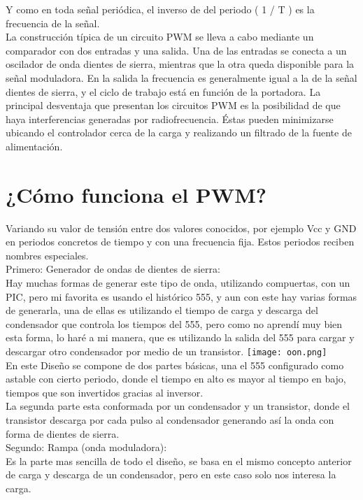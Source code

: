 \documentclass[10pt,a4paper]{article}
\begin{document}
Y como en toda señal periódica, el inverso de del periodo ( 1 / T ) es la frecuencia de la señal.\\
\bigskip 
La construcción típica de un circuito PWM se lleva a cabo mediante un comparador con dos entradas y una salida. Una de las entradas se conecta a un oscilador de onda dientes de sierra, mientras que la otra queda disponible para la señal moduladora. En la salida la frecuencia es generalmente igual a la de la señal dientes de sierra, y el ciclo de trabajo está en función de la portadora.
La principal desventaja que presentan los circuitos PWM es la posibilidad de que haya interferencias generadas por radiofrecuencia. Éstas pueden minimizarse ubicando el controlador cerca de la carga y realizando un filtrado de la fuente de alimentación.

\section{¿Cómo funciona el PWM? }
Variando su valor de tensión entre dos valores conocidos, por ejemplo Vcc y GND en periodos concretos de tiempo y con una frecuencia fija. Estos periodos reciben nombres especiales.\\
\bigskip
Primero: Generador de ondas de dientes de sierra:\\
Hay muchas formas de generar este tipo de onda, utilizando compuertas, con un PIC, pero mi favorita es usando el histórico 555, y aun con este hay varias formas de generarla, una de ellas es utilizando el tiempo de carga y descarga del condensador que controla los tiempos del 555, pero como no aprendí muy bien esta forma, lo haré a mi manera, que es utilizando la salida del 555 para cargar y descargar otro condensador por medio de un transistor.
\texttt{[image: oon.png]}\\
En este Diseño se compone de dos partes básicas, una el 555 configurado como astable con cierto periodo, donde el tiempo en alto es mayor al tiempo en bajo, tiempos que son invertidos gracias al inversor.\\
\bigskip
La segunda parte esta conformada por un condensador y un transistor, donde el transistor descarga por cada pulso al condensador generando así la onda con forma de dientes de sierra.\\ 
\bigskip
Segundo: Rampa (onda moduladora):\\
Es la parte mas sencilla de todo el diseño, se basa en el mismo concepto anterior de carga y descarga de un condensador, pero en este caso solo nos interesa la carga.\\
\end{document}

